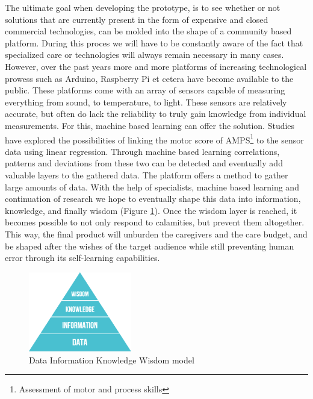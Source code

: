 \documentclass{below-ext}
\begin{document}
The ultimate goal when developing the prototype, is to see whether or not solutions that are currently present in the form of expensive and closed commercial technologies, can be molded into the shape of a community based platform. During this proces we will have to be constantly aware of the fact that specialized care or technologies will always remain necessary in many cases. However, over the past years more and more platforms of increasing technological prowess such as Arduino, Raspberry Pi et cetera have become available to the public. These platforms come with an array of sensors capable of measuring everything from sound, to temperature, to light. These sensors are relatively accurate, but often do lack the reliability to truly gain knowledge from individual measurements. For this, machine based learning can offer the solution. Studies have explored the possibilities of linking the motor score of AMPS\footnote{Assessment of motor and process skills} to the sensor data using linear regression\cite{grandma}. Through machine based learning correlations, patterns and deviations from these two can be detected and eventually add valuable layers to the gathered data. The platform offers a method to gather large amounts of data. With the help of specialists, machine based learning and continuation of research we hope to eventually shape this data into information, knowledge, and finally wisdom (Figure \ref{fig:dikw}). Once the wisdom layer is reached, it becomes possible to not only respond to calamities, but prevent them altogether. This way, the final product will unburden the caregivers and the care budget, and  be shaped after the wishes of the target audience  while still preventing human error through its self-learning capabilities.

\begin{figure}
\centering
\includegraphics[width=0.4\textwidth]{dikw}
\caption{Data Information Knowledge Wisdom model}
\label{fig:dikw}
\end{figure}

\end{document}
